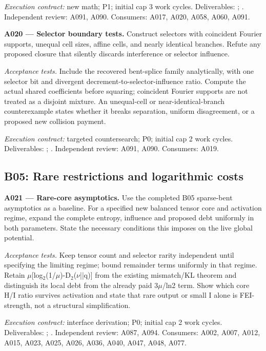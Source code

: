 \documentclass[11pt]{article}
\begin{document}
{\small\emph{Execution contract:} new math; P1; initial cap 3 work cycles. Deliverables: ; . Independent review: A091, A090. Consumers: A017, A020, A058, A060, A091.}

\textbf{A020 --- Selector boundary tests.} Construct selectors with coincident Fourier supports, unequal cell sizes, affine cells, and nearly identical branches. Refute any proposed closure that silently discards interference or selector influence.

\emph{Acceptance tests.} Include the recovered bent-splice family analytically, with one selector bit and divergent decrement-to-selector-influence ratio. Compute the actual shared coefficients before squaring; coincident Fourier supports are not treated as a disjoint mixture. An unequal-cell or near-identical-branch counterexample states whether it breaks separation, uniform disagreement, or a proposed new collision payment.

{\small\emph{Execution contract:} targeted countersearch; P0; initial cap 2 work cycles. Deliverables: ; . Independent review: A091, A090. Consumers: A019.}

\subsection{B05: Rare restrictions and logarithmic costs}

\textbf{A021 --- Rare-core asymptotics.} Use the completed B05 sparse-bent asymptotics as a baseline. For a specified new balanced tensor core and activation regime, expand the complete entropy, influence and proposed debt uniformly in both parameters. State the necessary conditions this imposes on the live global potential.

\emph{Acceptance tests.} Keep tensor count and selector rarity independent until specifying the limiting regime; bound remainder terms uniformly in that regime. Retain $\mu$[log$_2$(1/$\mu$)-D$_2$($\nu$||q)] from the existing mismatch/KL theorem and distinguish its local debt from the already paid 3$\mu$/ln2 term. Show which core H/I ratio survives activation and state that rare output or small I alone is FEI-strength, not a structural simplification.

{\small\emph{Execution contract:} interface derivation; P0; initial cap 2 work cycles. Deliverables: ; . Independent review: A087, A094. Consumers: A002, A007, A012, A015, A023, A025, A026, A036, A040, A047, A048, A077.}
\end{document}
